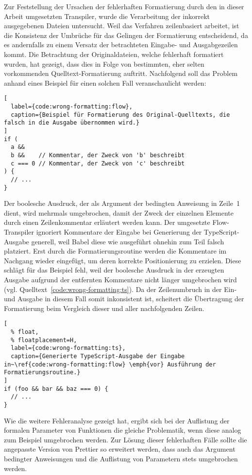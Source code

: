 Zur Feststellung der Ursachen der fehlerhaften Formatierung durch den in dieser Arbeit umgesetzten Transpiler, wurde die Verarbeitung der inkorrekt ausgegebenen Dateien untersucht. Weil das Verfahren zeilenbasiert arbeitet, ist die Konsistenz der Umbrüche für das Gelingen der Formatierung entscheidend, da es andernfalls zu einem Versatz der betrachteten Eingabe- und Ausgabgezeilen kommt. Die Betrachtung der Originaldateien, welche fehlerhaft formatiert wurden, hat gezeigt, dass dies in Folge von bestimmten, eher selten vorkommenden Quelltext-Formatierung auftritt. Nachfolgend soll das Problem anhand eines Beispiel für einen solchen Fall veranschaulicht werden:

\begin{lstlisting}[
  label={code:wrong-formatting:flow},
  caption={Beispiel für Formatierung des Original-Quelltexts, die falsch in die Ausgabe übernommen wird.}
]
if (
  a &&
  b &&    // Kommentar, der Zweck von 'b' beschreibt
  c === 0 // Kommentar, der Zweck von 'c' beschreibt
) {
  // ...
}
\end{lstlisting}

Der boolesche Ausdruck, der als Argument der bedingten Anweisung in Zeile~1 dient, wird mehrmals umgebrochen, damit der Zweck der einzelnen Elemente durch einen Zeilenkommentar erläutert werden kann. Der umgesetzte Flow-Transpiler ignoriert Kommentare der Eingabe bei Generierung der TypeScript-Ausgabe generell, weil Babel diese wie ausgeführt ohnehin zum Teil falsch platziert. Erst durch die Formatierungsroutine werden die Kommentare im Nachgang wieder eingefügt, um deren korrekte Positionierung zu erzielen. Diese schlägt für das Beispiel fehl, weil der boolesche Ausdruck in der erzeugten Ausgabe aufgrund der entfernten Kommentare nicht länger umgebrochen wird (vgl. Quelltext~\ref{code:wrong-formatting:ts}). Da der Zeilenumbruch in der Ein- und Ausgabe in diesem Fall somit inkonsistent ist, scheitert die Übertragung der Formatierung beim Vergleich dieser und aller nachfolgenden Zeilen.

\begin{lstlisting}[
  % float,
  % floatplacement=H,
  label={code:wrong-formatting:ts},
  caption={Generierte TypeScript-Ausgabe der Eingabe in~\ref{code:wrong-formatting:flow} \emph{vor} Ausführung der Formatierungsroutine.}
]
if (foo && bar && baz === 0) {
  // ...
}
\end{lstlisting}

Wie die weitere Fehleranalyse gezeigt hat, ergibt sich bei der Auflistung der formalen Parameter von Funktionen die gleiche Problematik, wenn diese analog zum Beispiel umgebrochen werden. Zur Lösung dieser fehlerhaften Fälle sollte die angepasste Version von Prettier so erweitert werden, dass auch das Argument bedingter Anweisungen und die Auflistung  von Parametern stets umgebrochen werden.

